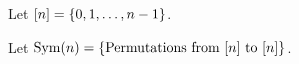\begin{definition}
    Let \( [n] = \left\{ 0, 1, \dots, n-1 \right\} \).
\end{definition}

\begin{definition}
    Let \( \operatorname{Sym}(n) = \left\{ \text{Permutations from } [n] \text{ to } [n] \right\} \).
\end{definition}